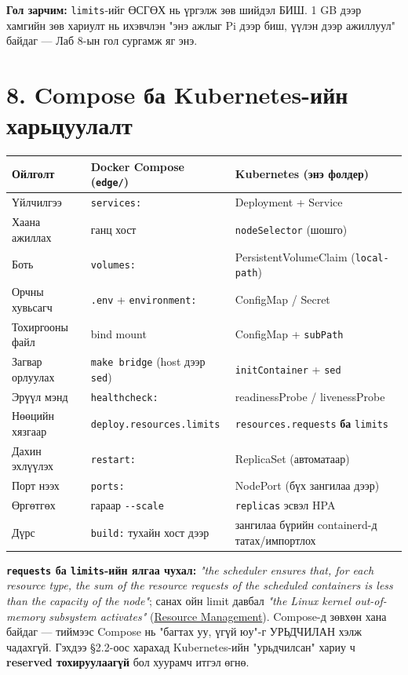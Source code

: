 \textbf{Гол зарчим:} \texttt{limits}-ийг ӨСГӨХ нь үргэлж зөв шийдэл БИШ. 1 GB дээр хамгийн зөв хариулт нь ихэвчлэн "энэ ажлыг Pi дээр биш, үүлэн дээр ажиллуул" байдаг --- Лаб 8-ын гол сургамж яг энэ.

\hypertarget{compose-ux431ux430-kubernetes-ux438ux439ux43d-ux445ux430ux440ux44cux446ux443ux443ux43bux430ux43bux442}{%
\section{8. Compose ба Kubernetes-ийн харьцуулалт}\label{compose-ux431ux430-kubernetes-ux438ux439ux43d-ux445ux430ux440ux44cux446ux443ux443ux43bux430ux43bux442}}

\begingroup\scriptsize\begin{longtable}[]{@{}lll@{}}
\toprule
Ойлголт & Docker Compose (\texttt{edge/}) & Kubernetes (энэ фолдер)\tabularnewline
\midrule
\endhead
Үйлчилгээ & \texttt{services:} & Deployment + Service\tabularnewline
Хаана ажиллах & ганц хост & \texttt{nodeSelector} (шошго)\tabularnewline
Боть & \texttt{volumes:} & PersistentVolumeClaim (\texttt{local-path})\tabularnewline
Орчны хувьсагч & \texttt{.env} + \texttt{environment:} & ConfigMap / Secret\tabularnewline
Тохиргооны файл & bind mount & ConfigMap + \texttt{subPath}\tabularnewline
Загвар орлуулах & \texttt{make\ bridge} (host дээр \texttt{sed}) & \texttt{initContainer} + \texttt{sed}\tabularnewline
Эрүүл мэнд & \texttt{healthcheck:} & readinessProbe / livenessProbe\tabularnewline
Нөөцийн хязгаар & \texttt{deploy.\allowbreak{}resources.\allowbreak{}limits} & \texttt{resources.\allowbreak{}requests} \textbf{ба} \texttt{limits}\tabularnewline
Дахин эхлүүлэх & \texttt{restart:} & ReplicaSet (автоматаар)\tabularnewline
Порт нээх & \texttt{ports:} & NodePort (бүх зангилаа дээр)\tabularnewline
Өргөтгөх & гараар \texttt{-\/-scale} & \texttt{replicas} эсвэл HPA\tabularnewline
Дүрс & \texttt{build:} тухайн хост дээр & зангилаа бүрийн containerd-д татах/импортлох\tabularnewline
\bottomrule
\end{longtable}\endgroup

\textbf{\texttt{requests} ба \texttt{limits}-ийн ялгаа чухал:} \emph{"the scheduler ensures that, for each resource type, the sum of the resource requests of the scheduled containers is less than the capacity of the node"}; санах ойн limit давбал \emph{"the Linux kernel out-of-memory subsystem activates"} (\href{https://kubernetes.io/docs/concepts/configuration/manage-resources-containers/}{Resource Management}). Compose-д зөвхөн хана байдаг --- тиймээс Compose нь "багтах уу, үгүй юу"-г УРЬДЧИЛАН хэлж чадахгүй. Гэхдээ §2.2-оос харахад Kubernetes-ийн "урьдчилсан" хариу ч \textbf{reserved тохируулаагүй} бол хуурамч итгэл өгнө.

